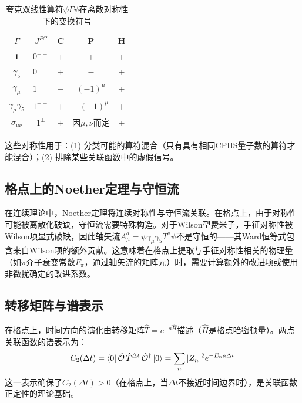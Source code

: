 \documentclass[11pt,a4paper]{ctexart}
\begin{document}
\begin{table}[htbp]
\centering
\caption{夸克双线性算符$\bar{\psi} \Gamma \psi$在离散对称性下的变换符号}
\begin{tabular}{c c c c c}
\toprule
$\Gamma$ & $J^{PC}$ & C & P & H \\
\midrule
$\mathbf{1}$ & $0^{++}$ & + & + & + \\
$\gamma_5$ & $0^{-+}$ & + & $-$ & + \\
$\gamma_\mu$ & $1^{--}$ & $-$ & $(-1)^\mu$ & + \\
$\gamma_\mu\gamma_5$ & $1^{++}$ & + & $-(-1)^\mu$ & + \\
$\sigma_{\mu\nu}$ & $1^{\pm}$ & $\pm$ & 因$\mu,\nu$而定 & + \\
\bottomrule
\end{tabular}
\label{tab:cphs}
\end{table}

这些对称性用于：(1) 分类可能的算符混合（只有具有相同CPHS量子数的算符才能混合）；(2) 排除某些关联函数中的虚假信号。

\subsection{格点上的Noether定理与守恒流}

在连续理论中，Noether定理将连续对称性与守恒流关联。在格点上，由于对称性可能被离散化破缺，守恒流需要特殊构造。对于Wilson型费米子，手征对称性被Wilson项显式破缺，因此轴矢流$A_\mu^a = \bar{\psi} \gamma_\mu \gamma_5 T^a \psi$不是守恒的——其Ward恒等式包含来自Wilson项的额外贡献。这意味着在格点上提取与手征对称性相关的物理量（如$\pi$介子衰变常数$F_\pi$，通过轴矢流的矩阵元）时，需要计算额外的改进项或使用非微扰确定的改进系数。

\subsection{转移矩阵与谱表示}

在格点上，时间方向的演化由转移矩阵$\hat{T} = e^{-a\hat{H}}$描述（$\hat{H}$是格点哈密顿量）。两点关联函数的谱表示为：
\begin{equation}
C_2(\Delta t) = \bra{0} \hat{\mathcal{O}} \, \hat{T}^{\Delta t} \, \hat{\mathcal{O}}^\dagger \ket{0}
= \sum_n |Z_n|^2 e^{-E_n a \Delta t}
\end{equation}
这一表示确保了$C_2(\Delta t) > 0$（在格点上，当$\Delta t$不接近时间边界时），是关联函数正定性的理论基础。


\end{document}

